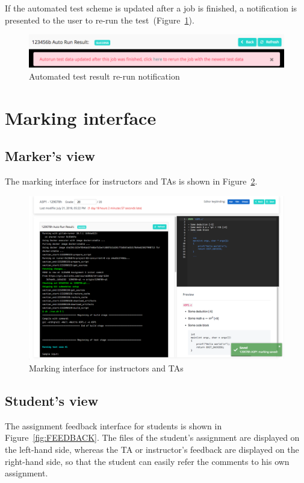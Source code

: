 If the automated test scheme is updated after a job is finished, a notification
is presented to the user to re-run the test~(Figure~\ref{fig:RERUN}).

\begin{figure}[H]
    \centering
        \includegraphics[width=1.0\textwidth]{figures/rerun}
    \caption{Automated test result re-run notification}
    \label{fig:RERUN}
\end{figure}

\section{Marking interface}
\subsection{Marker's view}
The marking interface for instructors and TAs is shown in
Figure~\ref{fig:MARKING}.

\begin{figure}[H]
    \centering
        \includegraphics[width=1.0\textwidth]{figures/marker}
    \caption{Marking interface for instructors and TAs}
    \label{fig:MARKING}
\end{figure}

\subsection{Student's view}
The assignment feedback interface for students is shown in
Figure~\ref{fig:FEEDBACK}.
The files of the student's assignment are displayed on the left-hand side,
whereas the TA or instructor's feedback are displayed on the right-hand side,
so that the student can easily refer the comments to his own assignment.

